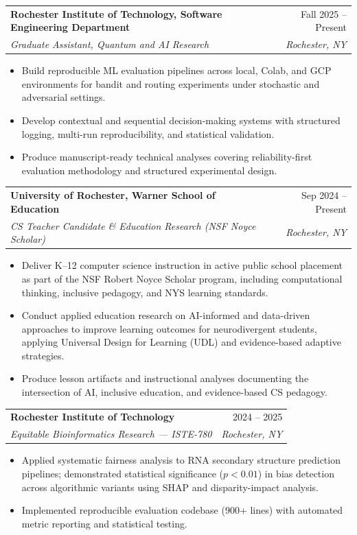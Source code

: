 \documentclass[11pt]{article}
\makeatletter
\newcommand{\entry}[4]{
  \noindent\begin{tabularx}{\textwidth}{@{}Xr@{}}
    \textbf{#1} & #2 \\
    \textit{#3} & \textit{#4}
  \end{tabularx}\vspace{2pt}
}
\makeatother
\begin{document}
\entry{Rochester Institute of Technology, Software Engineering Department}{Fall 2025 -- Present}{Graduate Assistant, Quantum and AI Research}{Rochester, NY}
\begin{itemize}
  \item Build reproducible ML evaluation pipelines across local, Colab, and GCP environments for bandit and routing experiments under stochastic and adversarial settings.
  \item Develop contextual and sequential decision-making systems with structured logging, multi-run reproducibility, and statistical validation.
  \item Produce manuscript-ready technical analyses covering reliability-first evaluation methodology and structured experimental design.
\end{itemize}

\entry{University of Rochester, Warner School of Education}{Sep 2024 -- Present}{CS Teacher Candidate \& Education Research (NSF Noyce Scholar)}{Rochester, NY}
\begin{itemize}
  \item Deliver K--12 computer science instruction in active public school placement as part of the NSF Robert Noyce Scholar program, including computational thinking, inclusive pedagogy, and NYS learning standards.
  \item Conduct applied education research on AI-informed and data-driven approaches to improve learning outcomes for neurodivergent students, applying Universal Design for Learning (UDL) and evidence-based adaptive strategies.
  \item Produce lesson artifacts and instructional analyses documenting the intersection of AI, inclusive education, and evidence-based CS pedagogy.
\end{itemize}

\entry{Rochester Institute of Technology}{2024 -- 2025}{Equitable Bioinformatics Research --- ISTE-780}{Rochester, NY}
\begin{itemize}
  \item Applied systematic fairness analysis to RNA secondary structure prediction pipelines; demonstrated statistical significance ($p < 0.01$) in bias detection across algorithmic variants using SHAP and disparity-impact analysis.
  \item Implemented reproducible evaluation codebase (900+ lines) with automated metric reporting and statistical testing.
\end{itemize}
\end{document}
